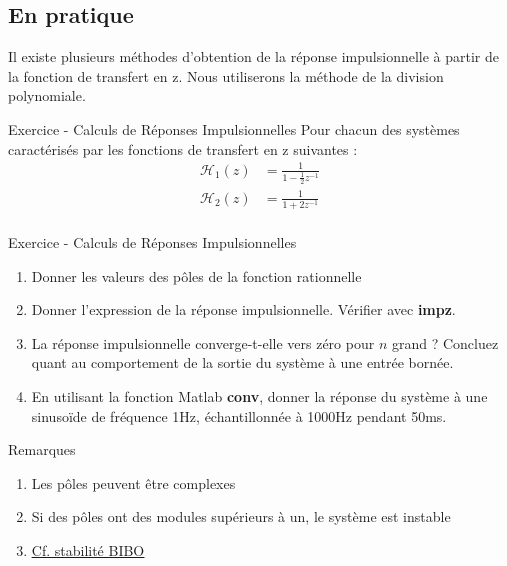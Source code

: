 \documentclass[a4paper,11pt]{beamer}
\newcounter{exampleBlockCounter}
\begin{document}
\subsection{En pratique}
\begin{frame}
\justifying
Il existe plusieurs méthodes d'obtention de la réponse impulsionnelle à partir
de la fonction de transfert en z. Nous utiliserons la méthode de la division
polynomiale.
\begin{exampleblock}{Exercice  - Calculs de Réponses
Impulsionnelles} 
\justifying
Pour chacun des systèmes caractérisés par les fonctions de
transfert en z suivantes :
$$
\begin{aligned}
\mathcal{H}_1(z) &= \frac{1}{1-\frac{1}{2}z^{-1}}\\
\mathcal{H}_2(z) &= \frac{1}{1+2z^{-1}}\\
\end{aligned}
$$
\end{exampleblock}
\end{frame}

\begin{frame}
\begin{exampleblock}{Exercice  - Calculs de Réponses
Impulsionnelles}
\begin{enumerate}
  \justifying
  \item Donner les valeurs des pôles de la fonction rationnelle
  \item Donner l'expression de la réponse impulsionnelle. Vérifier avec
  \textbf{impz}.
  \item La réponse impulsionnelle converge-t-elle vers zéro pour $n$ grand ?
  Concluez quant au comportement de la sortie du système à une entrée bornée.
  \item En utilisant la fonction Matlab \textbf{conv}, donner la réponse du
  système à une sinusoïde de fréquence 1Hz, échantillonnée à 1000Hz pendant
  50ms.
\end{enumerate}
\end{exampleblock}
\end{frame}

\begin{frame} 
\begin{alertblock}{Remarques}
\begin{enumerate}
  \item Les pôles peuvent être complexes
  \item Si des pôles ont des modules supérieurs à un, le système est instable
  \item
  \href{https://en.wikipedia.org/wiki/BIBO_stability}{\underline{Cf. stabilité
  BIBO}}
\end{enumerate}
\end{alertblock}
\end{frame}
\end{document}
